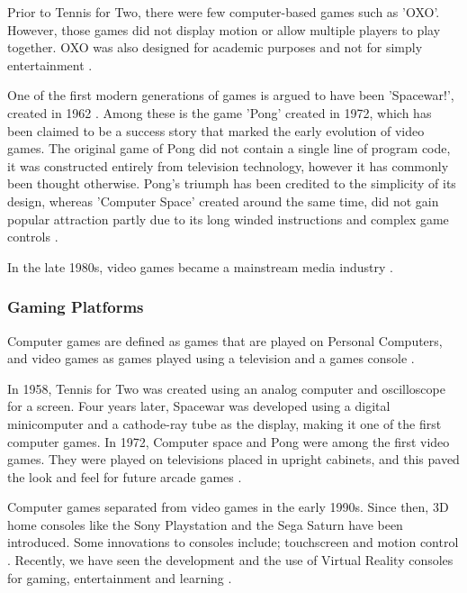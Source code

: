 \documentclass[a4paper,11.5pt]{report}
\numberwithin{figure}{section}
\numberwithin{table}{section}
\numberwithin{equation}{section}
\numberwithin{equation}{section}
\begin{document}
Prior to Tennis for Two, there were few computer-based games such as 'OXO'. However, those games did not display motion or allow multiple players to play together. OXO was also designed for academic purposes and not for simply entertainment \cite{TennisForTwo}.

One of the first modern generations of games is argued to have been 'Spacewar!', created in 1962 \cite{Hector2003}. Among these is the game 'Pong' created in 1972, which has been claimed to be a success story that marked the early evolution of video games. The original game of Pong did not contain a single line of program code, it was constructed entirely from television technology, however it has commonly been thought otherwise. Pong's triumph has been credited to the simplicity of its design, whereas 'Computer Space' created around the same time, did not gain popular attraction partly due to its long winded instructions and complex game controls \cite{Lowood2009}.

In the late 1980s, video games became a mainstream media industry \cite{Dmitri2003}.

\subsubsection{Gaming Platforms}

Computer games are defined as games that are played on Personal Computers, and video games as games played using a television and a games console \cite{Cummings07}.

In 1958, Tennis for Two was created using an analog computer and oscilloscope for a screen. Four years later, Spacewar was developed using a digital minicomputer and a cathode-ray tube as the display, making it one of the first computer games. In 1972, Computer space and Pong were among the first video games. They were played on televisions placed in upright cabinets, and this paved the look and feel for future arcade games \cite{TennisForTwo, Lowood2009}.

Computer games separated from video games in the early 1990s. Since then, 3D home consoles like the Sony Playstation and the Sega Saturn have been introduced. Some innovations to consoles include; touchscreen and motion control \cite{Cummings07}. Recently, we have seen the development and the use of Virtual Reality consoles for gaming, entertainment and learning \cite{vrhaptics}.

\end{document}
